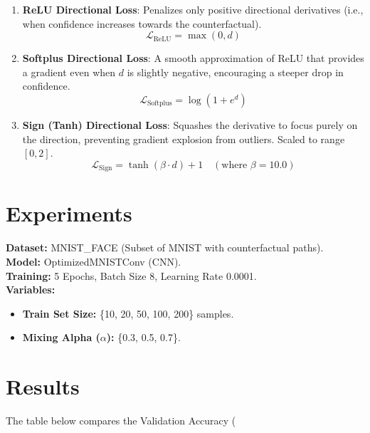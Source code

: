 \documentclass{article}
\begin{document}
\begin{enumerate}
    \item \textbf{ReLU Directional Loss}: Penalizes only positive directional derivatives (i.e., when confidence increases towards the counterfactual).
    \[
    \mathcal{L}_{\text{ReLU}} = \max(0, d)
    \]
    
    \item \textbf{Softplus Directional Loss}: A smooth approximation of ReLU that provides a gradient even when $d$ is slightly negative, encouraging a steeper drop in confidence.
    \[
    \mathcal{L}_{\text{Softplus}} = \log(1 + e^d)
    \]
    
    \item \textbf{Sign (Tanh) Directional Loss}: Squashes the derivative to focus purely on the direction, preventing gradient explosion from outliers. Scaled to range $[0, 2]$.
    \[
    \mathcal{L}_{\text{Sign}} = \tanh(\beta \cdot d) + 1 \quad (\text{where } \beta = 10.0)
    \]
\end{enumerate}

\section{Experiments}

\textbf{Dataset:} MNIST\_FACE (Subset of MNIST with counterfactual paths). \\
\textbf{Model:} OptimizedMNISTConv (CNN). \\
\textbf{Training:} 5 Epochs, Batch Size 8, Learning Rate 0.0001. \\
\textbf{Variables:}
\begin{itemize}
    \item \textbf{Train Set Size:} \{10, 20, 50, 100, 200\} samples.
    \item \textbf{Mixing Alpha ($\alpha$):} \{0.3, 0.5, 0.7\}.
\end{itemize}

\section{Results}

The table below compares the Validation Accuracy (%
\end{document}
